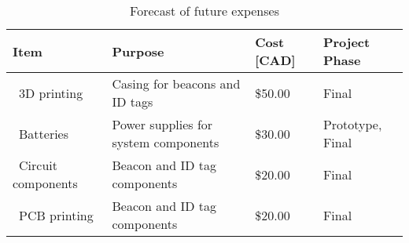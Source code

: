 \begin{table}[H]
\centering
\begin{tabular}{ | m{4.75cm} | m{5cm} | m{2.5cm} | m{3cm} |}
\hline
\textbf{Item} & \textbf{Purpose} & \textbf{Cost [CAD]} & \textbf{Project Phase}  \\
\hline
\ 3D printing & Casing for beacons and ID tags & \$50.00 & Final  \\
\hline
\ Batteries & Power supplies for system components & \$30.00 & Prototype, Final \\
\hline
\ Circuit components & Beacon and ID tag components & \$20.00 & Final \\
\hline
\ PCB printing & Beacon and ID tag components & \$20.00 & Final \\
\hline
\end{tabular}
\caption{Forecast of future expenses}
\end{table}
